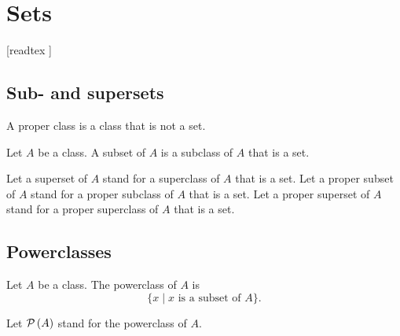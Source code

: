 \documentclass[../../set-theory/set-theory.tex]{subfiles}
\begin{document}
  \chapter{Sets}\label{chapter:sets}


  \begin{forthel}

    [readtex ]

  \end{forthel}


  \section{Sub- and supersets}

  \begin{forthel}
    \begin{definition}
      A proper class is a class that is not a set.
    \end{definition}
  \end{forthel}

  \begin{forthel}
    \begin{definition}
      Let $A$ be a class.
      A subset of $A$ is a subclass of $A$ that is a set.
    \end{definition}

    Let a superset of $A$ stand for a superclass of $A$ that is a set.
    Let a proper subset of $A$ stand for a proper subclass of $A$ that is a set.
    Let a proper superset of $A$ stand for a proper superclass of $A$ that is a
    set.
  \end{forthel}


  \section{Powerclasses}

  \begin{forthel}
    \begin{definition}
      Let $A$ be a class.
      The powerclass of $A$ is
      \[ \{ x \mid \text{$x$ is a subset of $A$} \}. \]
    \end{definition}

    Let $\mathcal{P}\left(A\right)$ stand for the powerclass of $A$.
  \end{forthel}
\end{document}
